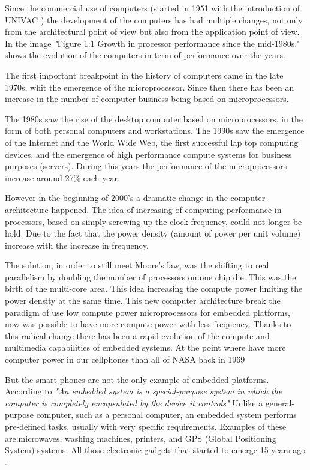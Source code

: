 Since the commercial use of computers (started in 1951 with the
introduction of UNIVAC \cite{Nur}) the development of the computers has had
multiple changes, not only from the architectural point of view but also from
the application point of view. In \cite{Hennessy} the image \textit"{Figure 1:1
Growth in processor performance since the mid-1980s."} shows the evolution of
the computers in term of performance over the years. 

The first important breakpoint in the history of computers came in the late
1970s, whit the emergence of the microprocessor. Since then there has been an
increase in the number of computer business being based on microprocessors. 

The 1980s saw the rise of the desktop computer based on microprocessors, in the
form of both personal computers and workstations. The 1990s saw the emergence
of the Internet and the World Wide Web, the first successful lap top computing
devices, and the emergence of high performance compute systems for business
purposes (servers). During this years the performance of the microprocessors
increase around 27\% each year.\cite{Hennessy}

However in the beginning of 2000's a dramatic change in the computer
architecture happened. The idea of increasing of computing performance in
processors, based on simply screwing up the clock frequency, could not longer
be hold. Due to the fact that the power density (amount of power per unit
volume) increase with the increase in frequency.

The solution, in order to still meet Moore's law, was the shifting to real
parallelism by doubling the number of processors on one chip die. This was the
birth of the multi-core area. This idea increasing the compute power limiting
the power density at the same time. This new computer architecture break the
paradigm of use low compute power microprocessors for embedded platforms, now
was possible to have more compute power with less frequency.  Thanks to this
radical change there has been a rapid evolution of the compute and multimedia
capabilities of embedded systems. At the point where have more computer power
in our cellphones than all of NASA back in 1969 \cite{Michio}



But the smart-phones are not the only example of embedded platforms.
According to \cite{Hallinan} \textit{"An embedded system is a special-purpose
system in which the computer is completely encapsulated by the device it
controls"} Unlike a general-purpose computer, such as a personal
computer, an embedded system performs pre-defined tasks, usually with very
specific requirements. Examples of these are:microwaves, washing machines, printers,
and GPS (Global Positioning System) systems. All those electronic
gadgets that started to emerge 15 years ago \cite{Nur}.

